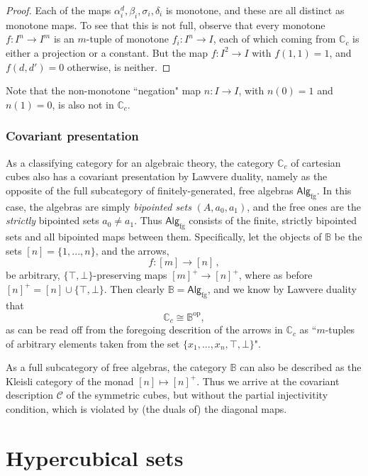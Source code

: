 \documentclass[11pt]{article}
\newcommand{\C}{\ensuremath{\mathbb{C}}}
\newcommand{\B}{\ensuremath{\mathbb{B}}}
\newcommand{\CC}{\ensuremath{\mathcal{C}}}
\theoremstyle{remark}
\theoremstyle{definition}
\begin{document}
\begin{proof}
Each of the maps $\alpha^d_i, \beta_i, \sigma_i, \delta_i$ is monotone, and these are all distinct as monotone maps.
To see that this is not full, observe that every monotone $f : I^n \to I^m$ is an $m$-tuple of monotone $f_i : I^n \to I$, each of which coming from $\C_c$ is either a projection or a constant.  But the map $f : I^2 \to I$ with $f(1,1) = 1$, and $f(d,d') = 0$ otherwise, is neither.
\end{proof}
%
Note that the non-monotone ``negation" map $n : I \to I$, with $n(0) = 1$ and $n(1) = 0$, is also not in $\C_c$.


\subsubsection*{Covariant presentation}

As a classifying category for an algebraic theory, the category $\C_c$ of cartesian cubes also has a covariant presentation by Lawvere duality, namely as the opposite of the full subcategory of finitely-generated, free algebras $\mathsf{Alg}_{\mathrm{fg}}$.  In this case, the algebras are simply \emph{bipointed sets} $(A, a_0, a_1)$, and the free ones are the \emph{strictly} bipointed sets $a_0\neq a_1$.  Thus $\mathsf{Alg}_{\mathrm{fg}}$ consists of the finite, strictly bipointed sets and all bipointed maps between them.  Specifically, let the objects of $\mathbb{B}$ be the sets $[n] = \{1, ..., n\}$, and the arrows,
\[
f : [m] \to [n]\,,
\]
be arbitrary, $\{\top, \bot\}$-preserving maps $[m]^+ \to [n]^+$, where as before $[n]^+ = [n]\cup\{\top, \bot\}$.  Then clearly $\B = \mathsf{Alg}_{\mathrm{fg}}$, and we know by Lawvere duality that $$\C_c \cong \B^{\mathrm{op}},$$ as can be read off from the foregoing descrition of the arrows in $\C_c$ as ``$m$-tuples of arbitrary elements taken from the set $\{x_1, ..., x_n, \top, \bot\}$".

As a full subcategory of free algebras, the category $\B$ can also be described as the Kleisli category of the monad $[n] \mapsto [n]^+$.   Thus we arrive at the covariant description $\CC$ of the symmetric cubes, but without the partial injectivitity condition, which is violated by (the duals of) the diagonal maps.

\section{Hypercubical sets}
\end{document}
